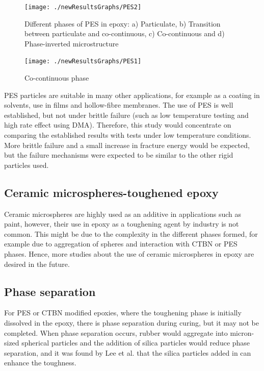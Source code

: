 \documentclass[numbers=noendperiod,chapterprefix=on]{icldt} %
\begin{document}
\begin{figure}[!hp]
\centering
\texttt{[image: ./newResultsGraphs/PES2]}
\caption{Different phases of PES in epoxy: a) Particulate, b) Transition between particulate and co-continuous, c) Co-continuous and d) Phase-inverted microstructure \cite{Chong2015}} \label{PES1}
\end{figure}

\begin{figure}[!hp]
\centering
\texttt{[image: ./newResultsGraphs/PES1]} 
\caption{Co-continuous phase \cite{Bagheri2009}}\label{PES2}
\end{figure}

PES particles are suitable in many other applications, for example as a coating in solvents, use in films and hollow-fibre membranes. The use of PES is well established, but not under brittle failure (such as low temperature testing and high rate effect using DMA). Therefore, this study would concentrate on comparing the established results with tests under low temperature conditions. More brittle failure and a small increase in fracture energy would be expected, but the  failure mechanisms were expected to be similar to the other rigid particles used.

\subsection{Ceramic microspheres-toughened epoxy}
Ceramic microspheres are highly used as an additive in applications such as paint, however, their use in epoxy as a toughening agent by industry is not common. This might be due to the complexity in the different phases formed, for example due to aggregation of spheres and interaction with CTBN or PES phases. Hence, more studies about the use of ceramic microspheres in epoxy are desired in the future.

\subsection{Phase separation}
For PES or CTBN modified epoxies, where the toughening phase is initially dissolved in the epoxy, there is phase separation during curing, but it may not be completed. 
When phase separation occurs, rubber would aggregate into micron-sized spherical particles and the addition of silica particles would reduce phase separation, and it was found by Lee et al. \cite{Lee2006} that the silica particles added in can enhance the toughness.
\end{document}
